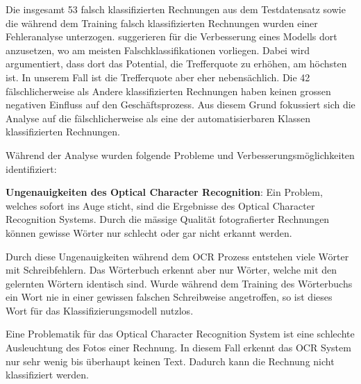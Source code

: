 

Die insgesamt 53 falsch klassifizierten Rechnungen aus dem Testdatensatz sowie die während dem Training falsch klassifizierten Rechnungen wurden einer Fehleranalyse unterzogen. \textcite{MLYearning} suggerieren für die Verbesserung eines Modells dort anzusetzen, wo am meisten Falschklassifikationen vorliegen. Dabei wird argumentiert, dass dort das Potential, die Trefferquote zu erhöhen, am höchsten ist. In unserem Fall ist die Trefferquote aber eher nebensächlich. Die 42 fälschlicherweise als Andere klassifizierten Rechnungen haben keinen grossen negativen Einfluss auf den Geschäftsprozess. Aus diesem Grund fokussiert sich die Analyse auf die fälschlicherweise als eine der automatisierbaren Klassen klassifizierten Rechnungen. 

Während der Analyse wurden folgende Probleme und Verbesserungsmöglichkeiten identifiziert:



\nopagebreak
\label{chap:ocr-quality}
\textbf{Ungenauigkeiten des Optical Character Recognition}: Ein Problem, welches sofort ins Auge sticht, sind die Ergebnisse des Optical Character Recognition Systems. Durch die mässige Qualität fotografierter Rechnungen können gewisse Wörter nur schlecht oder gar nicht erkannt werden. 

Durch diese Ungenauigkeiten während dem OCR Prozess entstehen viele Wörter mit Schreibfehlern. Das Wörterbuch erkennt aber nur Wörter, welche mit den gelernten Wörtern identisch sind. Wurde während dem Training des Wörterbuchs ein Wort nie in einer gewissen falschen Schreibweise angetroffen, so ist dieses Wort für das Klassifizierungsmodell nutzlos.

Eine Problematik für das Optical Character Recognition System ist eine schlechte Ausleuchtung des Fotos einer Rechnung. In diesem Fall erkennt das OCR System nur sehr wenig bis überhaupt keinen Text. Dadurch kann die Rechnung nicht klassifiziert werden.

